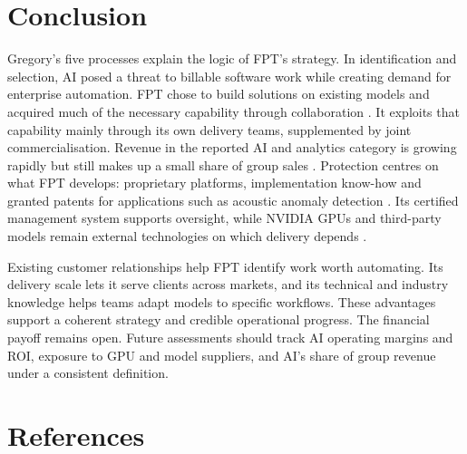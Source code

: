 \documentclass[a4paper,12pt]{report}
\begin{document}
\chapter{Conclusion}

Gregory's five processes explain the logic of FPT's strategy. In identification and selection, AI posed a threat to billable software work while creating demand for enterprise automation. FPT chose to build solutions on existing models and acquired much of the necessary capability through collaboration \cite{A8,A13,A16}. It exploits that capability mainly through its own delivery teams, supplemented by joint commercialisation. Revenue in the reported AI and analytics category is growing rapidly but still makes up a small share of group sales . Protection centres on what FPT develops: proprietary platforms, implementation know-how and granted patents for applications such as acoustic anomaly detection \cite{S13}. Its certified management system supports oversight, while NVIDIA GPUs and third-party models remain external technologies on which delivery depends \cite{S23,A21,A7}.

Existing customer relationships help FPT identify work worth automating. Its delivery scale lets it serve clients across markets, and its technical and industry knowledge helps teams adapt models to specific workflows. These advantages support a coherent strategy and credible operational progress. The financial payoff remains open. Future assessments should track AI operating margins and ROI, exposure to GPU and model suppliers, and AI's share of group revenue under a consistent definition.


\chapter*{References}
\printbibliography[heading=none]
\end{document}
